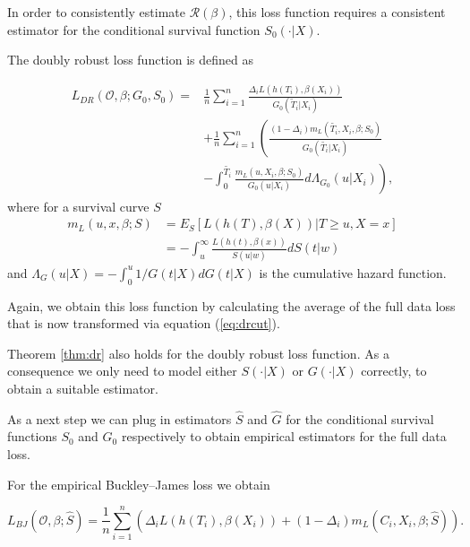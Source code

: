 \documentclass[12pt, a4paper]{scrartcl}
\theoremstyle{definition}
\theoremstyle{plain}
\numberwithin{equation}{section}
\numberwithin{figure}{section}
\numberwithin{table}{section}
\begin{document}
	In order to consistently estimate $\mathcal{R}(\beta)$, this loss function requires a consistent estimator for the conditional survival function $S_0(\cdot\vert X)$.
	
	The doubly robust loss function is defined as
	
	
	\begin{equation}\label{eq:dr}
	\begin{split}
		L_{DR}(\mathcal{O}, \beta; G_0, S_0) = & \frac{1}{n} \sum_{i=1}^n \frac{\Delta_i L(h(T_i),\beta(X_i))}{G_0(\tilde{T}_i\vert X_i)}\\
		~ & + \frac{1}{n} \sum_{i=1}^n \left(\frac{(1-\Delta_i)m_L(\tilde{T_i}, X_i, \beta; S_0)}{G_0(\tilde{T_i}\vert X_i)} \right.\\
		& - \left. \int _0^{\tilde{T_i}} \frac{m_L(u, X_i, \beta; S_0)}{G_0(u \vert X_i)} d \Lambda_{G_0}(u \vert X_i) \right),
	\end{split}
	\end{equation}
	where for a survival curve $S$
	\begin{equation}\label{eq:exploss}
	\begin{split}
		m_L(u,x,\beta; S) &= E_S[L(h(T), \beta(X)) \vert T \geq u, X = x]\\
		&= - \int_u^{\infty} \frac{L(h(t), \beta(x))}{S(u \vert w)} dS(t\vert w)
	\end{split}
	\end{equation}
	and $\Lambda_G(u\vert X) = - \int_0^u  1/ G(t\vert X)dG(t \vert X)$ is the cumulative hazard function.
	
	Again, we obtain this loss function by calculating the average of the full data loss that is now transformed via equation (\ref{eq:drcut}).
	
	Theorem \ref{thm:dr} also holds for the doubly robust loss function.
	As a consequence we only need to model either $S(\cdot\vert X)$ or $G(\cdot\vert X)$ correctly, to obtain a suitable estimator.
	
	As a next step we can plug in estimators $\hat{S}$ and $\hat{G}$ for the conditional survival functions $S_0$ and $G_0$ respectively to obtain empirical estimators for the full data loss.
	
	For the empirical Buckley--James loss we obtain
	
	\begin{equation*}
	L_{BJ}(\mathcal{O}, \beta; \hat{S}) = \frac{1}{n} \sum_{i=1}^n \left( \Delta_i L(h(T_i), \beta(X_i))+(1-\Delta_i)m_L(C_i, X_i, \beta; \hat{S})\right).
	\end{equation*}
	
\end{document}
